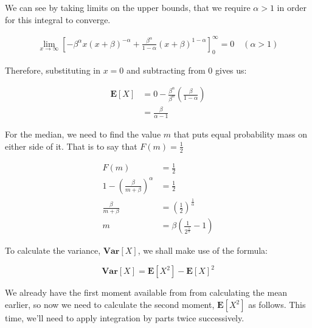\documentclass{article}
\begin{document}
We can see by taking limits on the upper bounds, that we require
$\alpha > 1$ in order for this integral to converge.

\begin{align*}
  \lim_{x \to \infty} {\left[
  - \beta^\alpha x {(x + \beta)}^{-\alpha}
  + \frac{\beta^{\alpha}}{1 - \alpha}
  {\left( x + \beta \right)}^{1 - \alpha}
  \right]}_0^{\infty} = 0
  \quad \left(  \alpha > 1 \right)
\end{align*}

Therefore, substituting in $x = 0$ and subtracting from $0$ gives us:

\begin{align*}
  \mathbf{E}\left[X\right] &= 0 - \frac{\beta^\alpha}{\beta^\alpha}
                             \left( \frac{\beta}{1 - \alpha}
                             \right) \\
                           &= \frac{\beta}{\alpha - 1}
\end{align*}

For the median, we need to find the value $m$ that puts equal
probability mass on either side of it. That is to say that $F(m) =
\frac{1}{2}$

\begin{align*}
  F(m) &= \frac{1}{2} \\
  1 - {\left( \frac{\beta}{m + \beta} \right)}^{\alpha} &= \frac{1}{2} \\
  \frac{\beta}{m + \beta} &= {\left( \frac{1}{2} \right)}^{\frac{1}{\alpha}} \\
  m &= \beta \left( \frac{1}{2^{\frac{1}{\alpha}}} - 1 \right)
\end{align*}

To calculate the variance, $\mathbf{Var}\left[ X \right]$, we shall
make use of the formula:

\[
  \mathbf{Var}\left[ X \right] = \mathbf{E}\left[X^2\right]
  - {\mathbf{E}\left[X\right]}^2
\]

We already have the first moment available from from calculating the
mean earlier, so now we need to calculate the second moment,
$\mathbf{E}\left[X^2\right]$ as follows. This time, we'll need to
apply integration by parts twice successively.
\end{document}
